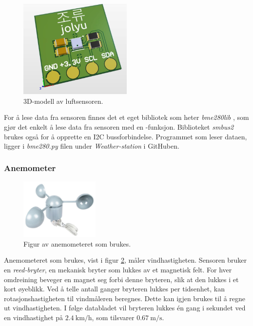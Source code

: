 \begin{figure}[H]
    \centering
    \includegraphics[width=0.5\textwidth]{implementering/vaer/luftsensor_3d.png}
    \caption{3D-modell av luftsensoren.}
    \label{fig:luftsensor_3d}
\end{figure}

For å lese data fra sensoren finnes det et eget bibliotek som heter \textit{bme280lib} \cite{bme280lib}, som gjør det enkelt å lese data fra sensoren med en -funksjon. 
Biblioteket \textit{smbus2} \cite{smbus2} brukes også for å opprette en I2C bussforbindelse. 
Programmet som leser dataen, ligger i \textit{bme280.py} filen under \textit{Weather-station} i GitHuben\cite{GitHub}.

\subsubsection{Anemometer}\label{sec:impl:vaer:anemometer}

\begin{figure}
    \centering
    \includegraphics[width=0.35\textwidth]{implementering/vaer/anemometer.png}
    \caption{Figur av anemometeret som brukes.}
    \label{fig:anemometer}
\end{figure}

Anemometeret som brukes, vist i figur \ref{fig:anemometer}, måler vindhastigheten. 
Sensoren bruker en \textit{reed-bryter}, en mekanisk bryter som lukkes av et magnetisk felt. 
For hver omdreining beveger en magnet seg forbi denne bryteren, slik at den lukkes i et kort øyeblikk. 
Ved å telle antall ganger bryteren lukkes per tidsenhet, kan rotasjonshastigheten til vindmåleren beregnes. 
Dette kan igjen brukes til å regne ut vindhastigheten. 
I følge databladet\cite{weather} vil bryteren lukkes én gang i sekundet ved en vindhastighet på $\SI{2.4}{\kilo\meter\per\hour}$, som tilsvarer $\SI{0.67}{\meter\per\second}$.

